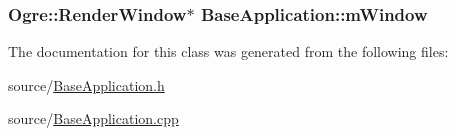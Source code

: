 \hypertarget{class_base_application_ac5d8e9c81e036897bc82f81eff8c570f}{
\subsubsection[{m\-Window}]{\setlength{\rightskip}{0pt plus 5cm}Ogre\-::\-Render\-Window$\ast$ Base\-Application\-::m\-Window\hspace{0.3cm}{\ttfamily [protected]}}}\label{class_base_application_ac5d8e9c81e036897bc82f81eff8c570f}


The documentation for this class was generated from the following files\-:\begin{DoxyCompactItemize}
\item 
source/\hyperlink{_base_application_8h}{Base\-Application.\-h}\item 
source/\hyperlink{_base_application_8cpp}{Base\-Application.\-cpp}\end{DoxyCompactItemize}
